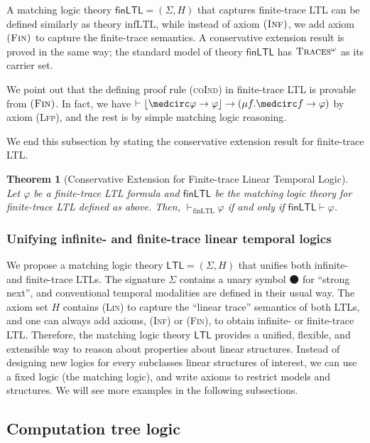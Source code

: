 \documentclass[letter,12pt]{article}
\newtheorem{theorem}{Theorem}
\newcommand{\imp}{\to}
\newcommand{\sig}{{\Sigma}}
\newcommand{\MLLTL}{\mathsf{LTL}}
\newcommand{\MLfinLTL}{\mathsf{finLTL}}
\DeclarePairedDelimiter{\floor}{\lfloor}{\rfloor}
\newcommand{\infLTL}{\mathrm{infLTL}}
\newcommand{\finLTL}{\mathrm{finLTL}}
\newcommand{\prule}[1]{\textsc{(#1)}}
\newcommand{\Lfp}{\prule{Lfp}\xspace}
\newcommand{\wnext}{{\medcirc}}
\newcommand{\snext}{{\medbullet}}
\newcommand{\infTraces}{\textsc{Traces$^\omega$}\xspace}
\newcommand{\Inf}{\prule{Inf}\xspace}
\newcommand{\Fin}{\prule{Fin}\xspace}
\newcommand{\Lin}{\prule{Lin}\xspace}
\begin{document}
A matching logic theory $\MLfinLTL = (\sig, H)$ that captures finite-trace LTL
can be defined similarly as theory $\infLTL$,
while instead of axiom $\Inf$, we add axiom $\Fin$ to capture the finite-trace semantics.
A conservative extension result is proved in the same way;
the standard model of theory $\MLfinLTL$ has $\infTraces$ as its carrier set.

We point out that the defining proof rule \prule{coInd} in finite-trace LTL
is provable from $\Fin$.
In fact, we have 
$\vdash \floor{\wnext \varphi \imp \varphi} \imp (\mu f . \wnext f \imp \varphi)$
by axiom \Lfp,
and the rest is by simple matching logic reasoning.

We end this subsection by stating the conservative extension result for
finite-trace LTL.

\begin{theorem}[Conservative Extension for Finite-trace Linear Temporal Logic]
\label{thm_csrvext_finLTL}
Let  $\varphi$ be a finite-trace LTL formula
and $\MLfinLTL$ be the matching logic theory for finite-trace LTL defined as above.
Then,  $\vdash_\finLTL \varphi$ if and only if
$\MLfinLTL \vdash \varphi$.
\end{theorem}

\subsubsection{Unifying infinite- and finite-trace linear temporal logics}

We propose a matching logic theory $\MLLTL = (\sig, H)$ that unifies both
infinite- and finite-trace LTLs.
The signature $\sig$ contains a unary symbol $\snext$ for ``strong next'',
and conventional temporal modalities are defined in their usual way.
The axiom set $H$ contains \Lin to capture the ``linear trace'' semantics
of both LTLs, and one can always add axioms, \Inf or \Fin, to obtain
infinite- or finite-trace LTL.
Therefore, the matching logic theory $\MLLTL$ provides a unified, flexible, and extensible
way to reason about properties about linear structures.
Instead of designing new logics for every subclasses linear structures of interest, 
we can use a fixed logic (the matching logic), and 
write axioms to restrict models and structures.
We will see more examples in the following subsections.

\subsection{Computation tree logic}
\label{sec_CTL}
\end{document}
